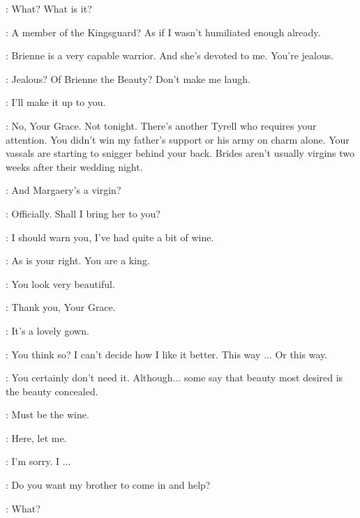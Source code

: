 
\RENLY: What? What is it? 

\LORAS: A member of the Kingsguard? As if I wasn't humiliated enough already. 

\RENLY: Brienne is a very capable warrior. And she's devoted to me. You're jealous. 

\LORAS: Jealous? Of Brienne the Beauty? Don't make me laugh. 

\RENLY: I'll make it up to you. 

\LORAS: No, Your Grace. Not tonight. There's another Tyrell who requires your attention. You didn't win my father's support or his army on charm alone. Your vassals are starting to snigger behind your back. Brides aren't usually virgins two weeks after their wedding night. 

\RENLY: And Margaery's a virgin? 

\LORAS: Officially. Shall I bring her to you? 


\RENLY: I should warn you, I've had quite a bit of wine. 

\MARGAERY: As is your right. You are a king. 

\RENLY: You look very beautiful. 

\MARGAERY: Thank you, Your Grace. 

\RENLY: It's a lovely gown. 

\MARGAERY: You think so? I can't decide how I like it better. This way $\ldots$  Or this way.


\RENLY: You certainly don't need it. Although$\ldots$ some say that beauty most desired is the beauty concealed. 


\RENLY: Must be the wine. 

\MARGAERY: Here, let me. 


\RENLY: I'm sorry. I $\ldots$ 

\MARGAERY: Do you want my brother to come in and help? 

\RENLY: What? 


